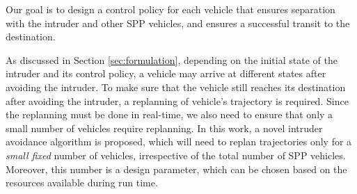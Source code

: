 Our goal is to design a control policy for each vehicle that ensures separation with the intruder and other SPP vehicles, and ensures a successful transit to the destination. %

As discussed in Section \ref{sec:formulation}, depending on the initial state of the intruder and its control policy, a vehicle may arrive at different states after avoiding the intruder. To make sure that the vehicle still reaches its destination after avoiding the intruder, a replanning of vehicle's trajectory is required. Since the replanning must be done in real-time, we also need to ensure that only a small number of vehicles require replanning. In this work, a novel intruder avoidance algorithm is proposed, which will need to replan trajectories only for a \textit{small fixed} number of vehicles, irrespective of the total number of SPP vehicles. Moreover, this number is a design parameter, which can be chosen based on the resources available during run time. 

